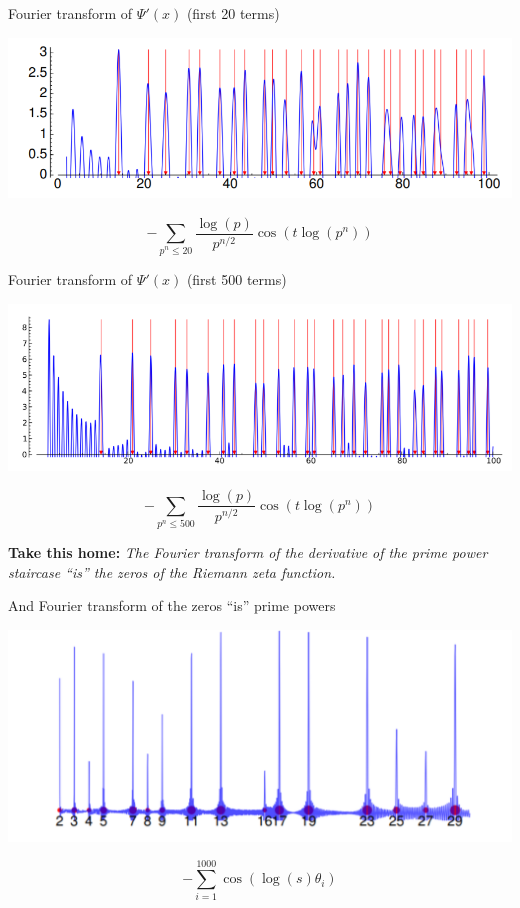 \documentclass{beamer}
\begin{document}
\begin{frame}{Fourier transform of $\Psi'(x)$ (first 20 terms)}


\includegraphics[height=.41\textheight]{pics/prime-power-freq-20}

\vfill

$$
-\sum_{p^n\leq 20}{\frac{\log(p)}{p^{n/2}}}\cos(t\log(p^n))
$$

\end{frame}


\begin{frame}{Fourier transform of $\Psi'(x)$ (first 500 terms)}

\includegraphics[height=.43\textheight]{pics/prime-power-freq-500}
\vfill

$$
-\sum_{p^n\leq 500}{\frac{\log(p)}{p^{n/2}}}\cos(t\log(p^n))
$$

{\bf Take this home:}
{\em The Fourier transform of the derivative of the prime power staircase ``is'' the
zeros of the Riemann zeta function.}

\end{frame}


\begin{frame}{And Fourier transform of the zeros ``is'' prime powers}


\begin{center}
\includegraphics[height=.55\textheight]{pics/zeros-series-1000}
\end{center}

$$-\sum_{i=1}^{1000}
   \cos(\log(s)\theta_i)$$
   

\end{frame}
\end{document}
